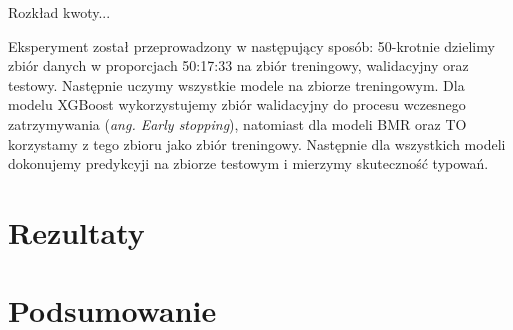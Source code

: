 \documentclass{book}
\begin{document}
Rozkład kwoty...

Eksperyment został przeprowadzony w następujący sposób:
50-krotnie dzielimy zbiór danych w proporcjach 50:17:33 na zbiór treningowy, walidacyjny oraz testowy. Następnie uczymy wszystkie modele na zbiorze treningowym. Dla modelu XGBoost wykorzystujemy zbiór walidacyjny do procesu wczesnego zatrzymywania (\textit{ang. Early stopping}), natomiast dla modeli BMR oraz TO korzystamy z tego zbioru jako zbiór treningowy. Następnie dla wszystkich modeli dokonujemy predykcyji na zbiorze testowym i mierzymy skuteczność typowań.

\chapter{Rezultaty}

\chapter{Podsumowanie}


\end{document}
